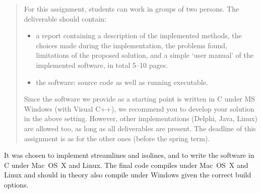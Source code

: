 \begin{quote}
For this assignment, students can work in groups of two persons. The
deliverable should contain: 

\begin{itemize}
  
  \item a report containing a description of the implemented methods, the
  choices made during the implementation, the problems found, limitations of
  the proposed solution, and a simple `user manual' of the implemented
  software, in total 5--10 pages. 

  \item the software: source code as well as running executable. 

\end{itemize}

Since the software we provide as a starting point is written in C under MS
Windows (with Visual C++), we recommend you to develop your solution in the
above setting. However, other implementations (Delphi, Java, Linux) are allowed
too, as long as all deliverables are present. The deadline of this assignment
is as for the other ones (before the spring term).

\end{quote}

It was chosen to implement streamlines and isolines, and to write the software
in C under Mac~OS~X and Linux. The final code compiles under Mac~OS~X and Linux
and should in theory also compile under Windows given the correct build options.

